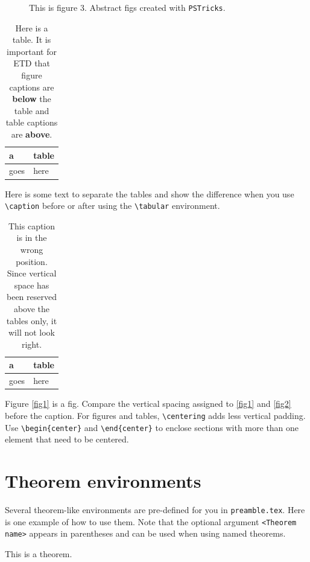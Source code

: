 \begin{figure}[htpb]
\label{fig3}
\centering

\caption[This is figure 3.]{This is figure 3. Abstract figs created with \texttt{PSTricks}.}
\end{figure}

\begin{table}[h]
\caption[Here is a table.]{Here is a table. It is important for ETD that figure captions are \textbf{below} the table and table captions are \textbf{above}.}
\centering
\begin{tabular}{|l|l|}
\hline
a & table\\
\hline
goes& here\\
\hline
\end{tabular}
\end{table}
Here is some text to separate the tables and show the difference when you use \verb|\caption| before or after using the \verb|\tabular| environment.
\begin{table}[h]
\centering
\begin{tabular}{|l|l|}
\hline
a & table\\
\hline
goes& here\\
\hline
\end{tabular}
\caption[This caption is in the wrong position]{This caption is in the wrong position. Since vertical space has been reserved above the tables only, it will not look right.}
\end{table}

Figure \ref{fig1} is a fig. Compare the vertical spacing assigned to \cref{fig1} and \cref{fig2} before the caption. For figures and tables, \verb|\centering| adds less vertical padding. Use \verb|\begin{center}| and \verb|\end{center}| to enclose sections with more than one element that need to be centered. 

\section{Theorem environments}
Several theorem-like environments are pre-defined for you in \texttt{preamble.tex}. Here is one example of how to use them. Note that the optional argument \verb|<Theorem name>| appears in parentheses and can be used when using named theorems. 

\begin{Thm}
\label{mythm}
This is a theorem.
\end{Thm}

